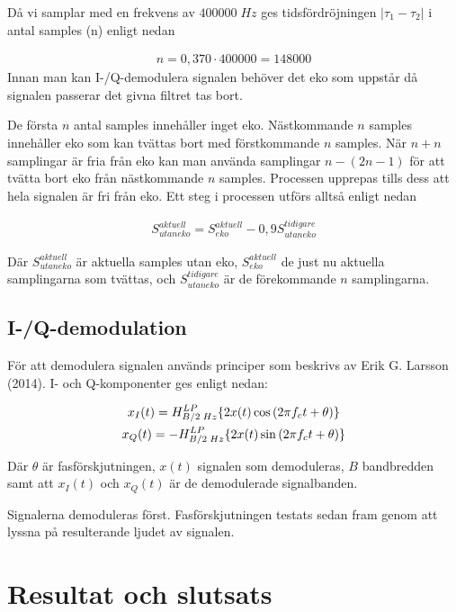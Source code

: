 \documentclass[10pt,twocolumn]{article}
\begin{document}
Då vi samplar med en frekvens av $400 000\;Hz$ ges tidsfördröjningen $|\tau_1 - \tau_2|$ i antal samples (n) enligt nedan 

\begin{gather}
n = 0,370 \cdot 400 000 = 148 000
\label{equ:delaySamples}
\end{gather}
Innan man kan I-/Q-demodulera signalen behöver det eko som uppstår då signalen passerar det givna filtret tas bort. 

De första $n$ antal samples innehåller inget eko. Nästkommande $n$ samples innehåller eko som kan tvättas bort med förstkommande $n$ samples. När $n+n$ samplingar är fria från eko kan man använda samplingar $n-(2n-1)$ för att tvätta bort eko från nästkommande $n$ samples. Processen upprepas tills dess att hela signalen är fri från eko. Ett steg i processen utförs alltså enligt nedan

\begin{gather}
S_{utan eko}^{aktuell} = S_{eko}^{aktuell} - 0,9S_{utan eko}^{tidigare}
\label{equ:eko}
\end{gather}

Där $S_{utan eko}^{aktuell}$ är aktuella samples utan eko, $S_{eko}^{aktuell}$ de just nu aktuella samplingarna som tvättas, och $S_{utan eko}^{tidigare}$ är de förekommande $n$ samplingarna. 

\subsection{I-/Q-demodulation}

För att demodulera signalen används principer som beskrivs av Erik G. Larsson (2014). I- och Q-komponenter ges enligt nedan: 

\begin{gather}
x_{I}(t) = \Large{H}_{B/2\;Hz}^{LP}\{2x(t)\cos{(2{\pi}f_{c}t + \theta)}\} \\
x_{Q}(t) = -\Large{H}_{B/2\;Hz}^{LP}\{2x(t)\sin{(2{\pi}f_{c}t + \theta)}\}
\label{equ:iq}
\end{gather}

Där $\theta$ är fasförskjutningen, $x(t)$ signalen som demoduleras, $B$ bandbredden samt att $x_{I}(t)$ och $x_{Q}(t)$ är de demodulerade signalbanden. 

Signalerna demoduleras först. Fasförskjutningen testats sedan fram genom att lyssna på resulterande ljudet av signalen. 


\section{Resultat och slutsats}
\end{document}
